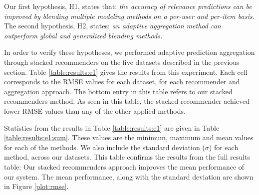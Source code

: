 Our first hypothesis, H1, states that:
{
  \itshape
  the accuracy of relevance predictions can be improved
  by blending multiple modeling methods on a per-user and per-item basis.
}
The second hypothesis, H2, states:
{
  \itshape
  an adaptive aggregation method can outperform global and generalized 
  blending methods.
}

In order to verify these hypotheses, we performed adaptive prediction aggregation
through stacked recommenders on the five datasets described in the previous section.
Table \ref{table:results:e1} gives the results from this experiment.
Each cell corresponds to the RMSE values for each dataset,
for each recommender and aggregation approach.
The bottom entry in this table refers to our stacked recommenders method.
As seen in this table, the stacked recommender achieved
lower RMSE values than any of the other applied methods.

Statistics from the results in Table \ref{table:results:e1} 
are given in Table \ref{table:results:e1:sum}.
These values are the minimum, maximum and mean values
for each of the methods. We also include
the standard deviation ($\sigma$) for each method,
across our datasets.
This table confirms the results from the full results table:
Our stacked recommenders approach improves the mean performance
of our system.
The mean performance, along with the standard deviation
are shown in Figure \ref{plot:rmse}.


